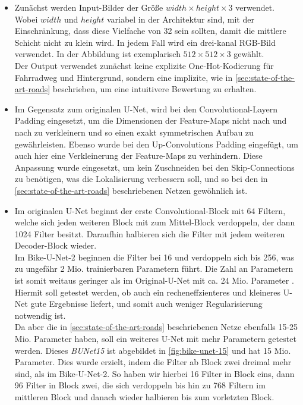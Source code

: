\begin{itemize}
	\item Zunächst werden Input-Bilder der Größe $width \times height \times 3$ verwendet. 
	Wobei $width$ und $height$ variabel in der Architektur sind, mit der Einschränkung, 
	dass diese Vielfache von 32 sein sollten, damit die mittlere Schicht nicht zu klein wird. 
	In jedem Fall wird ein drei-kanal RGB-Bild verwendet. In der Abbildung ist exemplarisch $512 \times 512 \times 3$ gewählt. \\
	Der Output verwendet zunächst keine explizite One-Hot-Kodierung für Fahrradweg und Hintergrund, 
	sondern eine implizite, wie in \autoref{sec:state-of-the-art-roads} beschrieben, 
	um eine intuitivere Bewertung zu erhalten. 
	\item Im Gegensatz zum originalen U-Net, wird bei den Convolutional-Layern Padding eingesetzt,
	um die Dimensionen der Feature-Maps nicht nach und nach zu verkleinern und so einen exakt symmetrischen Aufbau zu gewährleisten.
	Ebenso wurde bei den Up-Convolutions Padding eingefügt, um auch hier eine Verkleinerung der Feature-Maps zu verhindern.
	Diese Anpassung wurde eingesetzt, um kein Zuschneiden bei den Skip-Connections zu benötigen, was die Lokalisierung verbessern soll,
	und so bei den in \autoref{sec:state-of-the-art-roads} beschriebenen Netzen gewöhnlich ist.
	\item Im originalen U-Net beginnt der erste Convolutional-Block mit 64 Filtern, 
	welche sich jeden weiteren Block mit zum Mittel-Block verdoppeln, der dann 1024 Filter besitzt.
	Daraufhin halbieren sich die Filter mit jedem weiteren Decoder-Block wieder. \\
	Im Bike-U-Net-2 beginnen die Filter bei 16 und verdoppeln sich bis 256, was zu ungefähr 2 Mio. 
	trainierbaren Parametern führt. Die Zahl an Parametern ist somit weitaus geringer als im 
	Original-U-Net mit ca. 24 Mio. Parameter \cite{Ronneberger.18052015}. 
	Hiermit soll getestet werden, ob auch ein recheneffzienteres und kleineres U-Net gute Ergebnisse liefert, 
	und somit auch weniger Regularisierung notwendig ist. \\
	Da aber die in \autoref{sec:state-of-the-art-roads} beschriebenen Netze ebenfalls 15-25 Mio. Parameter haben, 
	soll ein weiteres U-Net mit mehr Parametern getestet werden. Dieses \textit{\ac{BUNet15}} ist 
	abgebildet in \autoref{fig:bike-unet-15} und hat 15 Mio. Parameter. Dies wurde erzielt, 
	indem die Filter ab Block zwei dreimal mehr sind, als im Bike-U-Net-2. So haben wir hierbei 16 Filter in Block eins, 
	dann 96 Filter in Block zwei, die sich verdoppeln bis hin zu 768 Filtern im mittleren Block und danach wieder halbieren bis zum vorletzten Block. 

\end{itemize}
